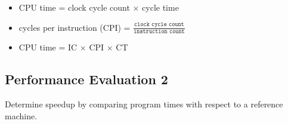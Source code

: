 \documentclass[12pt]{extarticle}
\begin{document}
	\begin{itemize}
		\item CPU time = clock cycle count $\times$ cycle time
		\item cycles per instruction (CPI) = $\frac{\texttt{clock cycle count}}{\texttt{instruction count}}$
		\item CPU time = IC $\times$ CPI $\times$ CT
	\end{itemize}

	\subsection{Performance Evaluation 2}

	Determine speedup by comparing program times with respect to a reference machine.

	
\end{document}
